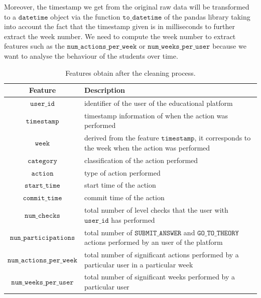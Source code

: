 \documentclass[sigplan,screen]{acmart}
\begin{document}
Moreover, the timestamp we get from the original raw data will be transformed to a $\texttt{datetime}$ object via the function $\texttt{to\_datetime}$ of the pandas library taking into account the fact that the timestamp given is in milliseconds to further extract the week number. We need to compute the week number to extract features such as the $\texttt{num\_actions\_per\_week}$ or $\texttt{num\_weeks\_per\_user}$ because we want to analyse the behaviour of the students over time.


\begin{table}[h]
  \caption{Features obtain after the cleaning process.}
  \label{tab:features}
  \begin{tabular}{cl}
    \toprule
    \textbf{Feature}&\textbf{Description}\\
    \midrule
    $\texttt{user\_id}$ & identifier of the user of the educational platform \\
    $\texttt{timestamp}$ & timestamp information of when the action was performed \\
    $\texttt{week}$ & derived from the feature $\texttt{timestamp}$, it corresponds to the week when the action was performed \\
    $\texttt{category}$ & classification of the action performed \\
    $\texttt{action}$ & type of action performed \\
    $\texttt{start\_time}$ & start time of the action \\
    $\texttt{commit\_time}$ & commit time of the action \\
    $\texttt{num\_checks}$ & total number of level checks that the user with $\texttt{user\_id}$ has performed \\
    $\texttt{nun\_participations}$ & total number of $\texttt{SUBMIT\_ANSWER}$ and $\texttt{GO\_TO\_THEORY}$ actions performed by an user of the platform \\
    $\texttt{num\_actions\_per\_week}$ & total number of significant actions performed by a particular user in a particular week \\
    $\texttt{num\_weeks\_per\_user}$ & total number of significant weeks performed by a particular user \\
    \bottomrule
    \end{tabular}
\end{table}
\end{document}
